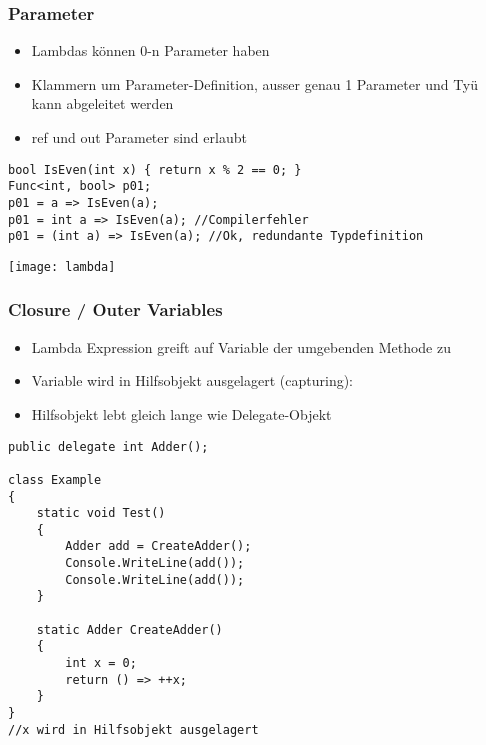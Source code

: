\begin{multicols*}{2}
\subsubsection{Parameter}
\begin{itemize}
    \item Lambdas können 0-n Parameter haben
    \item Klammern um Parameter-Definition, ausser genau 1 Parameter und Tyü kann abgeleitet werden
    \item ref und out Parameter sind erlaubt
\end{itemize}
\begin{lstlisting}
bool IsEven(int x) { return x % 2 == 0; }
Func<int, bool> p01;
p01 = a => IsEven(a);
p01 = int a => IsEven(a); //Compilerfehler
p01 = (int a) => IsEven(a); //Ok, redundante Typdefinition
\end{lstlisting}
\texttt{[image: lambda]}
\clearpage
\subsubsection{Closure / Outer Variables} 
\begin{itemize}
    \item Lambda Expression greift auf Variable der umgebenden Methode zu
    \item Variable wird in Hilfsobjekt ausgelagert (capturing):
    \item Hilfsobjekt lebt gleich lange wie Delegate-Objekt
\end{itemize}
\begin{lstlisting}
public delegate int Adder(); 

class Example
{
    static void Test()
    {
        Adder add = CreateAdder(); 
        Console.WriteLine(add()); 
        Console.WriteLine(add());
    }

    static Adder CreateAdder()
    {
        int x = 0;
        return () => ++x;
    }
}
//x wird in Hilfsobjekt ausgelagert
\end{lstlisting}
\end{multicols*}
